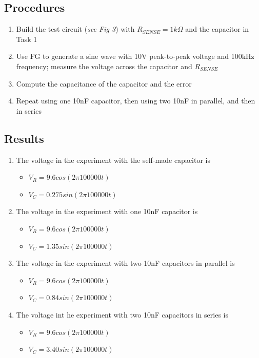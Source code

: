 \documentclass[journal, letterpaper]{IEEEtran}
\begin{document}
    \subsection{Procedures}
    	\begin{enumerate}
    	\item Build the test circuit (\textit{see Fig 3}) with $R_{SENSE} = 1k\Omega$ and the capacitor in Task 1
        \item Use FG to generate a sine wave with 10V peak-to-peak voltage and 100kHz frequency; measure the voltage across the capacitor and $R_{SENSE}$
        \item Compute the capacitance of the capacitor and the error
        \item Repeat using one 10nF capacitor, then using two 10nF in parallel, and then in series
    	\end{enumerate}
    \subsection{Results}
\begin{enumerate}
\item The voltage in the experiment with the self-made capacitor is \begin{itemize}
\item $V_R = 9.6cos(2\pi100000t)$
\item $V_C = 0.275sin(2\pi100000t)$
\end{itemize}
\item The voltage in the experiment with one 10nF capacitor is \begin{itemize}
\item $V_R = 9.6cos(2\pi100000t)$
\item $V_C = 1.35sin(2\pi100000t)$
\end{itemize}
\newpage
\item The voltage in the experiment with two 10nF capacitors in parallel is \begin{itemize}
\item $V_R = 9.6cos(2\pi100000t)$
\item $V_C = 0.84sin(2\pi100000t)$
\end{itemize}
\item The voltage int he experiment with two 10nF capacitors in series is \begin{itemize}
\item $V_R = 9.6cos(2\pi100000t)$
\item $V_C = 3.40sin(2\pi100000t)$
\end{itemize}
\end{enumerate}
\end{document}
